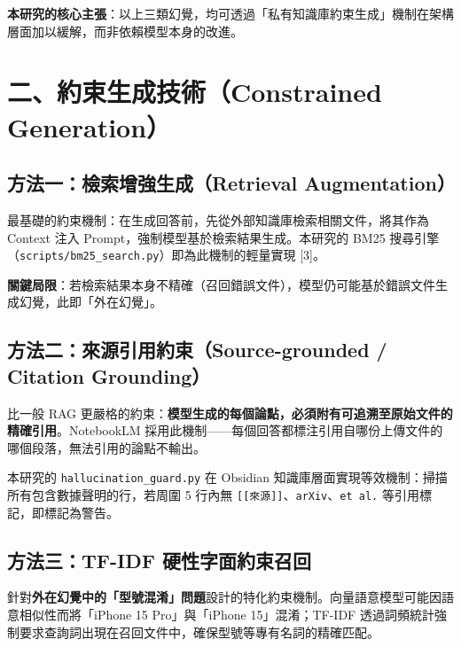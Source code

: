 \textbf{本研究的核心主張}：以上三類幻覺，均可透過「私有知識庫約束生成」機制在架構層面加以緩解，而非依賴模型本身的改進。

\section{二、約束生成技術（Constrained
Generation）}\label{ux4e8cux7d04ux675fux751fux6210ux6280ux8853constrained-generation}

\subsection{方法一：檢索增強生成（Retrieval
Augmentation）}\label{ux65b9ux6cd5ux4e00ux6aa2ux7d22ux589eux5f37ux751fux6210retrieval-augmentation}

最基礎的約束機制：在生成回答前，先從外部知識庫檢索相關文件，將其作為
Context 注入 Prompt，強制模型基於檢索結果生成。本研究的 BM25
搜尋引擎（\texttt{scripts/bm25\_search.py}）即為此機制的輕量實現
{[}3{]}。

\textbf{關鍵局限}：若檢索結果本身不精確（召回錯誤文件），模型仍可能基於錯誤文件生成幻覺，此即「外在幻覺」。

\subsection{方法二：來源引用約束（Source-grounded / Citation
Grounding）}\label{ux65b9ux6cd5ux4e8cux4f86ux6e90ux5f15ux7528ux7d04ux675fsource-grounded-citation-grounding}

比一般 RAG
更嚴格的約束：\textbf{模型生成的每個論點，必須附有可追溯至原始文件的精確引用}。NotebookLM
採用此機制------每個回答都標注引用自哪份上傳文件的哪個段落，無法引用的論點不輸出。

本研究的 \texttt{hallucination\_guard.py} 在 Obsidian
知識庫層面實現等效機制：掃描所有包含數據聲明的行，若周圍 5 行內無
\texttt{{[}{[}來源{]}{]}}、\texttt{arXiv}、\texttt{et\ al.}
等引用標記，即標記為警告。

\subsection{方法三：TF-IDF
硬性字面約束召回}\label{ux65b9ux6cd5ux4e09tf-idf-ux786cux6027ux5b57ux9762ux7d04ux675fux53ecux56de}

針對\textbf{外在幻覺中的「型號混淆」問題}設計的特化約束機制。向量語意模型可能因語意相似性而將「iPhone
15 Pro」與「iPhone 15」混淆；TF-IDF
透過詞頻統計強制要求查詢詞出現在召回文件中，確保型號等專有名詞的精確匹配。

